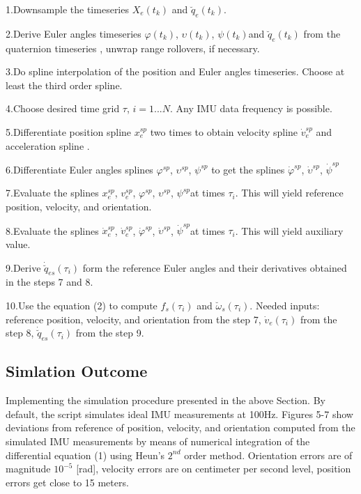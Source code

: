 \documentclass[conference]{IEEEtran}
\begin{document}
1.Downsample the timeseries $X_{e}(t_{k})$ and $\breve q_{e}(t_{k})$.

2.Derive Euler angles timeseries $\varphi(t_{k})$, $\upsilon(t_{k})$, $\psi(t_{k})$and $\breve q_{e}(t_{k})$ from the quaternion timeseries , unwrap range rollovers, if necessary.

3.Do spline interpolation of the position and Euler angles timeseries. Choose at least the third order spline.

4.Choose desired time grid $\tau$, $i = 1...N$. Any IMU data frequency is possible.

5.Differentiate position spline $x_e^{sp}$ two times to obtain velocity spline $\dot v_e^{sp}$ and acceleration spline .

6.Differentiate Euler angles splines $\varphi^{sp}$, $\upsilon^{sp}$, $\psi^{sp}$ to get the splines $\dot \varphi^{sp}$, $ \dot\upsilon^{sp}$, $\dot \psi^{sp}$

7.Evaluate the splines $x_e^{sp}$, $v_e^{sp}$, $\varphi^{sp}$, $\upsilon^{sp}$, $\psi^{sp}$at times $\tau_i$. This will yield reference position, velocity, and orientation.

8.Evaluate the splines $\dot x_e^{sp}$, $\dot v_e^{sp}$, $\dot \varphi^{sp}$, $\dot \upsilon^{sp}$, $\dot \psi^{sp}$at times $\tau_i$. This will yield auxiliary value.

9.Derive $\dot{\breve q}_{es}(\tau_i)$ form the reference Euler angles and their derivatives obtained in the steps 7 and 8. 

10.Use the equation (2) to compute $f_s(\tau_i)$ and $\breve{\omega}_s(\tau_i)$. Needed inputs: reference position, velocity, and orientation from the step 7, $\dot{v}_e(\tau_i)$ from the step 8, $\dot{\breve q}_{es}(\tau_i)$ from the step 9.

\subsection{Simlation Outcome}

Implementing the simulation procedure presented in the above Section. By default, the script simulates ideal IMU measurements at 100Hz. Figures 5-7 show deviations from reference of position, velocity, and orientation computed from the simulated IMU measurements by means of numerical integration of the differential equation (1) using Heun’s $2^{nd}$ order method. Orientation errors are of magnitude $10^{-5}$ [rad], velocity errors are on centimeter per second level, position errors get close to 15 meters.
\end{document}
